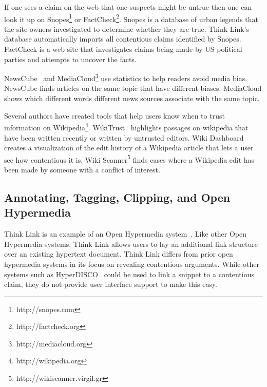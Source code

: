 \documentclass{chi2009}
\newcommand{\todo}[1]{}
\begin{document}
If one sees a claim on the web that one suspects might be untrue then one can look it up on Snopes\footnote{http://snopes.com} or FactCheck\footnote{http://factcheck.org}. Snopes is a database of urban legends that the site owners investigated to determine whether they are true. 
Think Link's database automatically imports all contentious claims identified by Snopes.
FactCheck is a web site that investigates claims being made by US political parties and attempts to uncover the facts. 


\todo{Make sure we stay in sync}

NewsCube~\cite{Park2009} and MediaCloud\footnote{http://mediacloud.org} use statistics to help readers avoid media bias. NewsCube finds articles on the same topic that have different biases. MediaCloud shows which different words different news sources associate with the same topic.

Several authors have created tools that help users know when to trust information on Wikipedia\footnote{http://wikipedia.org}. WikiTrust~\cite{Adler2008a} highlights passages on wikipedia that have been written recently or written by untrusted editors. Wiki Dashboard~\cite{Kittur2008} creates a visualization of the edit history of a Wikipedia article that lets a user see how contentious it is. Wiki Scanner\footnote{http://wikiscanner.virgil.gr} finds cases where a Wikipedia edit has been made by someone with a conflict of interest.

% 
% 

\subsection{Annotating, Tagging, Clipping, and Open Hypermedia}

Think Link is an example of an Open Hypermedia system~\cite{Bouvin2000}. Like other Open Hypermedia systems, Think Link allows users to lay an additional link structure over an existing hypertext document. Think Link differs from prior open hypermedia systems in its focus on revealing contentious arguments. While other systems such as HyperDISCO~\cite{Wiil1996} could be used to link a snippet to a contentious claim, they do not provide user interface support to make this easy.
\end{document}
